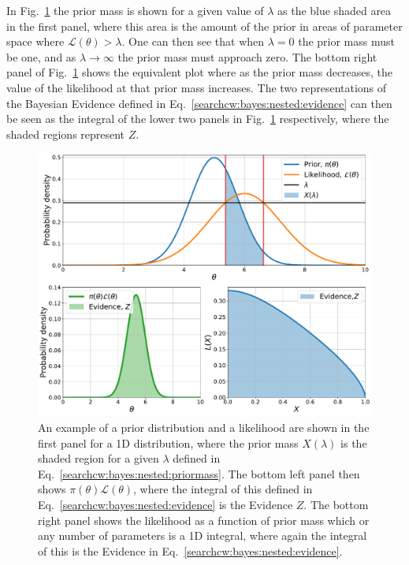 In Fig.~\ref{cwinto:bayes:nestedsampling:plots} the prior mass is shown for a
given value of $\lambda$ as the blue shaded area in the first panel, where this area is the amount of the prior in areas of parameter space where $\mathcal{L}(\theta) > \lambda$.
One can then see that when $\lambda= 0$ the prior mass must be one, and as $\lambda \rightarrow \infty$ the prior mass must approach zero. The bottom right panel of Fig.~\ref{cwinto:bayes:nestedsampling:plots} shows the equivalent plot where as the prior mass decreases, the value of the likelihood at that prior mass increases.
The two representations of the Bayesian Evidence defined in Eq.~\ref{searchcw:bayes:nested:evidence} can then be seen as the integral of the lower two panels in Fig.~\ref{cwinto:bayes:nestedsampling:plots} respectively, where the shaded regions represent $Z$. 
%
\begin{figure}[ht]
	\centering
	\includegraphics[width=0.8\linewidth]{C2_cw/nested_plots.pdf}
        \caption[Nested sampling]{An example of a prior distribution and a
likelihood are shown in the first panel for a 1D distribution, where the prior
mass $X(\lambda)$ is the shaded region for a given $\lambda$ defined in
Eq.~\ref{searchcw:bayes:nested:priormass}. The bottom left panel then shows
$\pi(\theta)\mathcal{L}(\theta)$, where the integral of this defined in
Eq.~\ref{searchcw:bayes:nested:evidence} is the Evidence $Z$. The bottom right
panel shows the likelihood as a function of prior mass which or any number of
parameters is a 1D integral, where again the integral of this is the Evidence
in Eq.~\ref{searchcw:bayes:nested:evidence}.}
\label{cwinto:bayes:nestedsampling:plots}

\end{figure}
%

